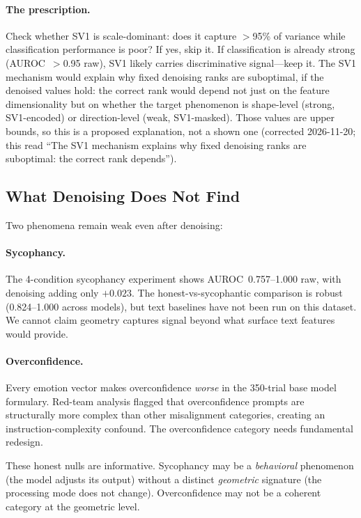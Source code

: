 \documentclass[11pt,a4paper]{article}
\begin{document}
\paragraph{The prescription.} Check whether SV1 is scale-dominant: does it
capture $>$95\% of variance while classification performance is poor? If yes,
skip it. If classification is already strong (AUROC~$>$0.95 raw), SV1 likely
carries discriminative signal---keep it. The SV1 mechanism would explain why
fixed denoising ranks are suboptimal, if the denoised values hold: the
correct rank would depend not just on the feature dimensionality but on
whether the target phenomenon is shape-level (strong, SV1-encoded) or
direction-level (weak, SV1-masked). Those values are upper bounds, so this
is a proposed explanation, not a shown one (corrected 2026-11-20; this
read ``The SV1 mechanism explains why fixed denoising ranks are
suboptimal: the correct rank depends'').

\subsection{What Denoising Does Not Find}
\label{sec:not_found}

Two phenomena remain weak even after denoising:

\paragraph{Sycophancy.} The 4-condition sycophancy experiment shows
AUROC~0.757--1.000 raw, with denoising adding only $+0.023$. The
honest-vs-sycophantic comparison is robust (0.824--1.000 across models), but
text baselines have not been run on this dataset. We cannot claim geometry
captures signal beyond what surface text features would provide.

\paragraph{Overconfidence.} Every emotion vector makes overconfidence
\emph{worse} in the 350-trial base model formulary. Red-team analysis
flagged that overconfidence prompts are structurally more complex than other
misalignment categories, creating an instruction-complexity confound. The
overconfidence category needs fundamental redesign.

These honest nulls are informative. Sycophancy may be a
\emph{behavioral} phenomenon (the model adjusts its output) without a
distinct \emph{geometric} signature (the processing mode does not change).
Overconfidence may not be a coherent category at the geometric level.
\end{document}
